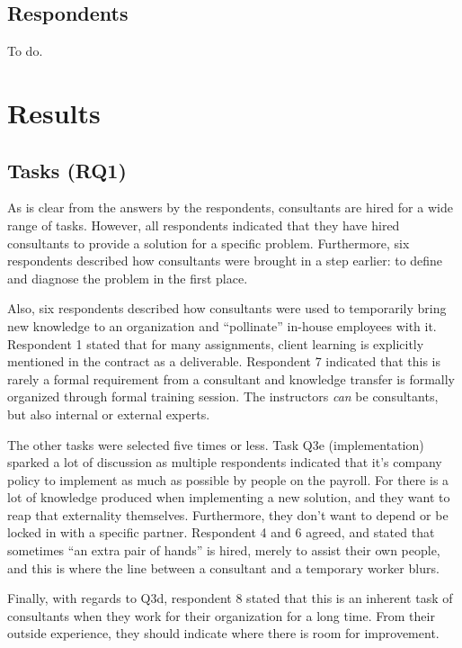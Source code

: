 \documentclass[12pt]{article}
\begin{document}
\subsection{Respondents}\label{respondents}

To do.

\section{Results}\label{results}

\subsection{Tasks (RQ1)}\label{tasks-rq1}

As is clear from the answers by the respondents, consultants are hired
for a wide range of tasks. However, all respondents indicated that they
have hired consultants to provide a solution for a specific problem.
Furthermore, six respondents described how consultants were brought in a
step earlier: to define and diagnose the problem in the first place.

Also, six respondents described how consultants were used to temporarily
bring new knowledge to an organization and ``pollinate'' in-house
employees with it. Respondent 1 stated that for many assignments, client
learning is explicitly mentioned in the contract as a deliverable.
Respondent 7 indicated that this is rarely a formal requirement from a
consultant and knowledge transfer is formally organized through formal
training session. The instructors \emph{can} be consultants, but also
internal or external experts.

The other tasks were selected five times or less. Task Q3e
(implementation) sparked a lot of discussion as multiple respondents
indicated that it's company policy to implement as much as possible by
people on the payroll. For there is a lot of knowledge produced when
implementing a new solution, and they want to reap that externality
themselves. Furthermore, they don't want to depend or be locked in with
a specific partner. Respondent 4 and 6 agreed, and stated that sometimes
``an extra pair of hands'' is hired, merely to assist their own people,
and this is where the line between a consultant and a temporary worker
blurs.

Finally, with regards to Q3d, respondent 8 stated that this is an
inherent task of consultants when they work for their organization for a
long time. From their outside experience, they should indicate where
there is room for improvement.
\end{document}
